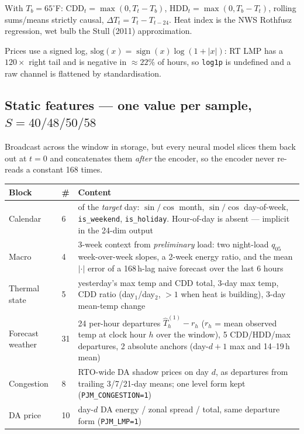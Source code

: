 \documentclass[11pt]{article}
\newcommand{\code}[1]{\texttt{\small #1}}
\begin{document}
\noindent
With $T_b = 65^\circ$F: $\mathrm{CDD}_t = \max(0, T_t - T_b)$,
$\mathrm{HDD}_t = \max(0, T_b - T_t)$, rolling sums/means strictly causal,
$\Delta T_t = T_t - T_{t-24}$. Heat index is the NWS Rothfusz regression,
wet bulb the Stull (2011) approximation.

\noindent
Prices use a signed log, $\mathrm{slog}(x) = \operatorname{sign}(x)\log(1+|x|)$:
RT LMP has a $120\times$ right tail and is negative in ${\approx}22\%$ of hours,
so \code{log1p} is undefined and a raw channel is flattened by standardisation.

\subsection{Static features --- one value per sample, $S = 40/48/50/58$}

Broadcast across the window in storage, but every neural model slices them back
out at $t=0$ and concatenates them \emph{after} the encoder, so the encoder never
re-reads a constant 168 times.

\begin{center}\small
\begin{tabular}{@{}llp{8.6cm}@{}}
\toprule
Block & \# & Content \\
\midrule
Calendar & 6 & of the \emph{target} day: $\sin/\cos$ month, $\sin/\cos$ day-of-week,
  \code{is\_weekend}, \code{is\_holiday}. Hour-of-day is absent --- implicit in the
  24-dim output \\
Macro & 4 & 3-week context from \emph{preliminary} load: two night-load $q_{05}$
  week-over-week slopes, a 2-week energy ratio, and the mean $|{\cdot}|$ error of a
  168\,h-lag naive forecast over the last 6 hours \\
Thermal state & 5 & yesterday's max temp and CDD total, 3-day max temp, CDD ratio
  (day$_1$/day$_2$, ${>}1$ when heat is building), 3-day mean-temp change \\
Forecast weather & 31 & 24 per-hour departures $\hat T^{(1)}_h - r_h$ ($r_h$ = mean
  observed temp at clock hour $h$ over the window), 5 CDD/HDD/max departures,
  2 absolute anchors (day-$d{+}1$ max and 14--19\,h mean) \\
Congestion & 8 & RTO-wide DA shadow prices on day $d$, as departures from trailing
  3/7/21-day means; one level form kept \hfill (\code{PJM\_CONGESTION=1}) \\
DA price & 10 & day-$d$ DA energy / zonal spread / total, same departure form
  \hfill (\code{PJM\_LMP=1}) \\
\bottomrule
\end{tabular}
\end{center}
\end{document}

